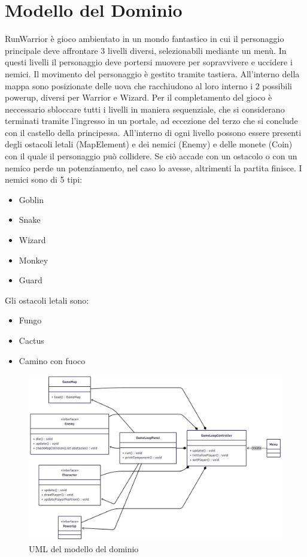 \documentclass[a4paper,12pt]{report}
\begin{document}
\section{Modello del Dominio}
RunWarrior è gioco ambientato in un mondo fantastico in cui il personaggio principale deve affrontare 3 livelli diversi, selezionabili mediante un menù.
In questi livelli il personaggio deve portersi muovere per sopravvivere e uccidere i nemici. Il movimento del personaggio è gestito tramite tastiera.
All'interno della mappa sono posizionate delle uova che racchiudono al loro interno i 2 possibili powerup, diversi per Warrior e Wizard.
Per il completamento del gioco è neccessario sbloccare tutti i livelli in maniera sequenziale, che si considerano terminati 
tramite l'ingresso in un portale, ad eccezione del terzo che si conclude con il castello della principessa.
All'interno di ogni livello possono essere presenti degli ostacoli letali (MapElement) e dei nemici (Enemy) e delle monete (Coin) con il quale il 
personaggio può collidere. Se ciò accade con un ostacolo o con un nemico perde un potenziamento, nel caso lo avesse, altrimenti la partita finisce.
I nemici sono di 5 tipi:
\begin{itemize}
    \item Goblin
    \item Snake
    \item Wizard
    \item Monkey 
    \item Guard
\end{itemize}
Gli ostacoli letali sono:
\begin{itemize}
    \item Fungo
    \item Cactus
    \item Camino con fuoco
\end{itemize}

\begin{figure}
    \centering
    \includegraphics[width=\textwidth]{resources/modelloDominioUML.png}
    \caption{UML del modello del dominio}
    \label{}
\end{figure}
\end{document}
